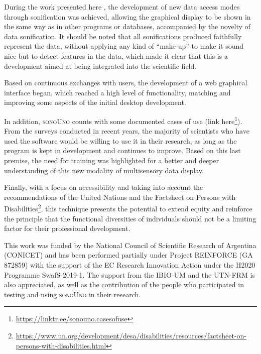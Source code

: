 \documentclass[baaa]{baaa}
\begin{document}
During the work presented here \citep{thesiscasado}, the development of new data access modes through sonification was achieved, allowing the graphical display to be shown in the same way as in other programs or databases, accompanied by the novelty of data sonification. It should be noted that all sonifications produced faithfully represent the data, without applying any kind of ``make-up'' to make it sound nice but to detect features in the data, which made it clear that this is a development aimed at being integrated into the scientific field.

Based on continuous exchanges with users, the development of a web graphical interface began, which reached a high level of functionality, matching and improving some aspects of the initial desktop development.

In addition, \textsc{sonoUno} counts with some documented cases of use (link {here}\footnote[7]{\url{https://linktr.ee/sonouno.casesofuse}}). From the surveys conducted in recent years, the majority of scientists who have used the software would be willing to use it in their research, as long as the program is kept in development and continues to improve. Based on this last premise, the need for training was highlighted for a better and deeper understanding of this new modality of multisensory data display.

Finally, with a focus on accessibility and taking into account the recommendations of the United Nations and the {Factsheet on Persons with Disabilities}\footnote[8]{\url{https://www.un.org/development/desa/disabilities/resources/factsheet-on-persons-with-disabilities.html}}, this technique presents the potential to extend equity and reinforce the principle that the functional diversities of individuals should not be a limiting factor for their professional development.

\begin{acknowledgement}

This work was funded by the National Council of Scientific Research of Argentina (CONICET) and has been performed partially under Project REINFORCE (GA 872859) with the support of the EC Research Innovation Action under the H2020 Programme SwafS-2019-1.
The support from the IBIO-UM and the UTN-FRM is also appreciated, as well as the contribution of the people who participated in testing and using \textsc{sonoUno} in their research.  

\end{acknowledgement}
\end{document}
